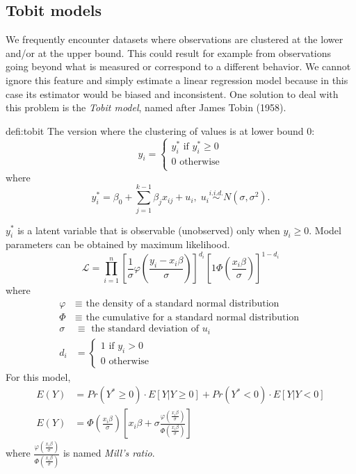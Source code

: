 \subsection{Tobit models}
	 We frequently encounter datasets where observations are clustered at the lower and/or at the upper bound. This could result for example from observations going beyond what is measured or correspond to a different behavior. We cannot ignore this feature and simply estimate a linear regression model because in this case its estimator would be biased and inconsistent. One solution to deal with this problem is the \emph{Tobit model}, named after James Tobin (1958).
	\begin{defi}{defi:tobit}
		The version where the clustering of values is at lower bound 0:
		\begin{equation*}
			y_i=\begin{cases}
				y_i^* \text{ if }y_i^* \geq 0\\
				0 \text{ otherwise}\\
			\end{cases}
		\end{equation*}
		where
		\begin{equation*}
			y_i^*=\beta_0+\sum\limits_{j=1}^{k-1} \beta_j x_{ij} + u_i,\; u_i \overset{i.i.d.}{\sim}N(\sigma,\sigma^2).
		\end{equation*}
	\end{defi}
	$y_i^*$ is a latent variable that is observable (unobserved) only when $y_i \geq 0$. Model parameters can be obtained by maximum likelihood.
	\begin{equation*}
		\mathcal{L}=\prod_{i=1}^{n}\left[\frac{1}{\sigma}\varphi\left(\frac{y_i-x_i \beta}{\sigma}\right)\right]^{d_i} \left[1\Phi\left(\frac{x_i \beta}{\sigma}\right)\right]^{1-d_i} %
	\end{equation*}
	where
	\begin{align*}
		\varphi&\equiv\text{ the density of a standard normal distribution }\\
		\Phi&\equiv\text{ the cumulative for a standard normal distribution }\\
		\sigma&\equiv\text{ the standard deviation of } u_i\\
		d_i&=\begin{cases}
			1\text{ if } y_i>0\\
			0\text{ otherwise}
		\end{cases}	
	\end{align*}
	For this model,
	\begin{align*}
		E(Y)&=Pr(Y^* \geq 0)\cdot E\left[Y|Y\geq 0\right]+ Pr(Y^* < 0)\cdot E\left[Y|Y< 0\right]\\%
		E(Y)&=\Phi\left(\frac{x_i \beta}{\sigma}\right)\left[x_i \beta + \sigma \frac{\varphi \left(\frac{x_i \beta}{\sigma}\right)}{\Phi \left(\frac{x_i \beta}{\sigma}\right)}\right]
	\end{align*}
	where $\frac{\varphi \left(\frac{x_i \beta}{\sigma}\right)}{\Phi \left(\frac{x_i \beta}{\sigma}\right)}$ is named \emph{Mill's ratio}. 
	
